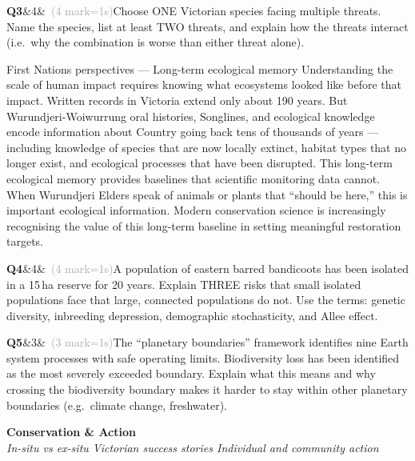 \documentclass[11pt,a4paper]{article}
\newcommand{\sectiondiv}[3]{%
  \needspace{5\baselineskip}
  \begin{tcolorbox}[
    enhanced, breakable=false, arc=3.5mm,
    colback=ForestDark, colframe=ForestDark, boxrule=0pt,
    sidebyside, sidebyside align=center,
    lefthand width=2.0cm,
    left=2mm, right=4mm, top=4mm, bottom=4mm
  ]
    \begin{center}
      \label{sec:#1}%
      {\headingfont\bfseries\color{Forest!35!ForestDark}\fontsize{50}{50}\selectfont #1}
    \end{center}
    \tcblower
    {\headingfont\bfseries\color{white}\LARGE #2}\\[3pt]
    {\itshape\color{white!75!ForestDark}\small #3}
  \end{tcolorbox}%
}
\newcommand{\answerbox}[1]{%
  \begin{tcolorbox}[
    enhanced, breakable, arc=2mm,
    colback=Paper, colframe=Line,
    left=2mm, right=2mm, top=1mm, bottom=1mm,
    boxrule=1pt,
    height=#1
  ]
  \end{tcolorbox}%
}
\newcommand{\question}[3]{%
  \needspace{3\baselineskip}%
  \medskip
  \noindent\textbf{Q#1}\ifx&#2&\else\ \textcolor{DarkGrey}{(#2 mark\ifnum#2=1\else s\fi)}\fi\quad #3%
  \medskip
}
\begin{document}
\begin{yr7box}
\question{3}{4}{Choose ONE Victorian species facing multiple threats. Name the species, list at least TWO threats, and explain how the threats interact (i.e.\ why the combination is worse than either threat alone).}
\answerbox{8cm}
\end{yr7box}

\begin{fnbox}{First Nations perspectives --- Long-term ecological memory}
Understanding the scale of human impact requires knowing what ecosystems looked like before that impact. Written records in Victoria extend only about 190 years. But Wurundjeri-Woiwurrung oral histories, Songlines, and ecological knowledge encode information about Country going back tens of thousands of years --- including knowledge of species that are now locally extinct, habitat types that no longer exist, and ecological processes that have been disrupted. This long-term ecological memory provides baselines that scientific monitoring data cannot. When Wurundjeri Elders speak of animals or plants that ``should be here,'' this is important ecological information. Modern conservation science is increasingly recognising the value of this long-term baseline in setting meaningful restoration targets.
\end{fnbox}

\begin{yr8box}
\question{4}{4}{A population of eastern barred bandicoots has been isolated in a 15\,ha reserve for 20 years. Explain THREE risks that small isolated populations face that large, connected populations do not. Use the terms: genetic diversity, inbreeding depression, demographic stochasticity, and Allee effect.}
\answerbox{7cm}

\question{5}{3}{The ``planetary boundaries'' framework identifies nine Earth system processes with safe operating limits. Biodiversity loss has been identified as the most severely exceeded boundary. Explain what this means and why crossing the biodiversity boundary makes it harder to stay within other planetary boundaries (e.g.\ climate change, freshwater).}
\answerbox{7cm}
\end{yr8box}

\newpage

\sectiondiv{11}{Conservation \& Action}{In-situ vs ex-situ \textbullet{} Victorian success stories \textbullet{} Individual and community action}
\end{document}
